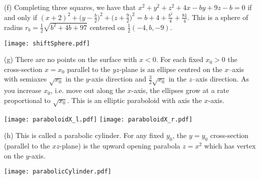 \begin{solution}
(f) 
Completing three squares, we have that
$x^2+y^2+z^2+4x-by+9z-b=0$ if and only if 
$(x+2)^2+\big(y-\frac{b}{2}\big)^2+\big(z+\frac{9}{2}\big)^2
=b+4+\frac{b^2}{4}+\frac{81}{4}$. 
This is a sphere of radius $r_b=\frac{1}{2}\sqrt{b^2+4b+97}$ centered on 
$\frac{1}{2}(-4,b,-9)$.
\begin{center}
     \texttt{[image: shiftSphere.pdf]}
\end{center}


(g)
There are no points on the surface with $x<0$.
For each fixed $x_0>0$ the cross-section $x=x_0$ parallel to the
$yz$-plane is an ellipse centred on the $x$--axis with semiaxes $\sqrt{x_0}$ 
in the $y$-axis direction and $\frac{3}{2}\sqrt{x_0}$ in the $z$--axis
direction.  As you increase $x_0$, i.e. move out along the $x$-axis, 
the ellipses grow at a rate proportional to $\sqrt{x_0}$. This is 
an elliptic paraboloid  with axis the $x$-axis.
\begin{center}
     \texttt{[image: paraboloidX\_l.pdf]}\qquad
     \texttt{[image: paraboloidX\_r.pdf]}
\end{center}


(h)
This is called a parabolic cylinder. For any fixed $y_0$, the  
$y=y_0$ cross-section (parallel to the $xz$-plane) is the upward
opening parabola $z=x^2$ which has vertex on the $y$-axis.
\begin{center}
     \texttt{[image: parabolicCylinder.pdf]}
\end{center}






\end{solution}






